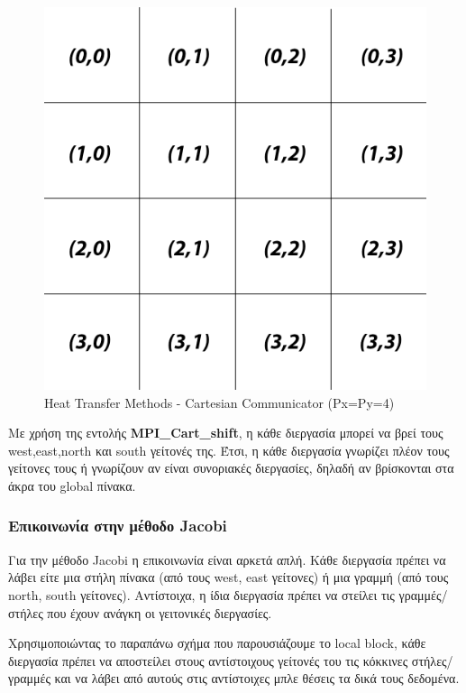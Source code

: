 \documentclass[../final_report.tex]{subfiles}
\begin{document}
\begin{figure}[H]
    \centering
    \includegraphics[scale=0.70]{cartesian_communicator.png}
    \caption{Heat Transfer Methods - Cartesian Communicator (Px=Py=4)}
    \label{fig:Heat Transfer Methods - Caertasian Communicator}
\end{figure}

Με χρήση της εντολής \textbf{MPI\_Cart\_shift}, η κάθε διεργασία μπορεί να βρεί τους west,east,north και south γείτονές της. Έτσι, η κάθε διεργασία γνωρίζει πλέον τους γείτονες τους
ή γνωρίζουν αν είναι συνοριακές διεργασίες, δηλαδή αν βρίσκονται στα άκρα του global πίνακα. 

\subsubsection*{Επικοινωνία στην μέθοδο Jacobi}
Για την μέθοδο Jacobi η επικοινωνία είναι αρκετά απλή. Κάθε διεργασία πρέπει να λάβει είτε μια στήλη πίνακα (από τους west, east γείτονες) ή μια γραμμή (από τους north, south γείτονες). 
Αντίστοιχα, η ίδια διεργασία πρέπει να στείλει τις γραμμές/στήλες που έχουν ανάγκη οι γειτονικές διεργασίες. 

Χρησιμοποιώντας το παραπάνω σχήμα που παρουσιάζουμε το local block, κάθε διεργασία πρέπει να αποστείλει στους αντίστοιχους γείτονές του τις κόκκινες στήλες/γραμμές και να λάβει από αυτούς
στις αντίστοιχες μπλε θέσεις τα δικά τους δεδομένα.
\end{document}
